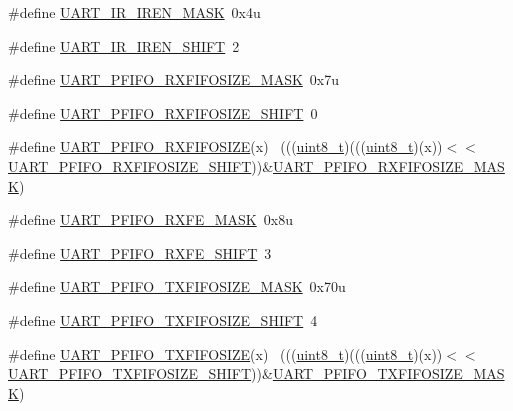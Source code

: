 \begin{DoxyCompactItemize}
\item 
\#define \hyperlink{group___u_a_r_t___register___masks_gafb25f2545b505763066c9f30ff7447f0}{U\+A\+R\+T\+\_\+\+I\+R\+\_\+\+I\+R\+E\+N\+\_\+\+M\+A\+SK}~0x4u
\item 
\#define \hyperlink{group___u_a_r_t___register___masks_ga674f392636537dcd6dd92309bead60b9}{U\+A\+R\+T\+\_\+\+I\+R\+\_\+\+I\+R\+E\+N\+\_\+\+S\+H\+I\+FT}~2
\item 
\#define \hyperlink{group___u_a_r_t___register___masks_gaf6314eec454a532d9baf2eff4ea61204}{U\+A\+R\+T\+\_\+\+P\+F\+I\+F\+O\+\_\+\+R\+X\+F\+I\+F\+O\+S\+I\+Z\+E\+\_\+\+M\+A\+SK}~0x7u
\item 
\#define \hyperlink{group___u_a_r_t___register___masks_gae4811b6796cb32adc0f9d172e9748e75}{U\+A\+R\+T\+\_\+\+P\+F\+I\+F\+O\+\_\+\+R\+X\+F\+I\+F\+O\+S\+I\+Z\+E\+\_\+\+S\+H\+I\+FT}~0
\item 
\#define \hyperlink{group___u_a_r_t___register___masks_gafd77c1537fe2b93d5ea7dd24c8cec96a}{U\+A\+R\+T\+\_\+\+P\+F\+I\+F\+O\+\_\+\+R\+X\+F\+I\+F\+O\+S\+I\+ZE}(x)                              ~(((\hyperlink{_p_e___types_8h_aba7bc1797add20fe3efdf37ced1182c5}{uint8\+\_\+t})(((\hyperlink{_p_e___types_8h_aba7bc1797add20fe3efdf37ced1182c5}{uint8\+\_\+t})(x))$<$$<$\hyperlink{group___u_a_r_t___register___masks_gae4811b6796cb32adc0f9d172e9748e75}{U\+A\+R\+T\+\_\+\+P\+F\+I\+F\+O\+\_\+\+R\+X\+F\+I\+F\+O\+S\+I\+Z\+E\+\_\+\+S\+H\+I\+FT}))\&\hyperlink{group___u_a_r_t___register___masks_gaf6314eec454a532d9baf2eff4ea61204}{U\+A\+R\+T\+\_\+\+P\+F\+I\+F\+O\+\_\+\+R\+X\+F\+I\+F\+O\+S\+I\+Z\+E\+\_\+\+M\+A\+SK})
\item 
\#define \hyperlink{group___u_a_r_t___register___masks_ga307298b76c15ac932486f994b3afc1b2}{U\+A\+R\+T\+\_\+\+P\+F\+I\+F\+O\+\_\+\+R\+X\+F\+E\+\_\+\+M\+A\+SK}~0x8u
\item 
\#define \hyperlink{group___u_a_r_t___register___masks_gae2a3c9994dc6da5a2955ac8c274bdaaf}{U\+A\+R\+T\+\_\+\+P\+F\+I\+F\+O\+\_\+\+R\+X\+F\+E\+\_\+\+S\+H\+I\+FT}~3
\item 
\#define \hyperlink{group___u_a_r_t___register___masks_ga61eb610888ac018061d20a755264292a}{U\+A\+R\+T\+\_\+\+P\+F\+I\+F\+O\+\_\+\+T\+X\+F\+I\+F\+O\+S\+I\+Z\+E\+\_\+\+M\+A\+SK}~0x70u
\item 
\#define \hyperlink{group___u_a_r_t___register___masks_gaa0377f9b585a07f11f887a7d2c8133c8}{U\+A\+R\+T\+\_\+\+P\+F\+I\+F\+O\+\_\+\+T\+X\+F\+I\+F\+O\+S\+I\+Z\+E\+\_\+\+S\+H\+I\+FT}~4
\item 
\#define \hyperlink{group___u_a_r_t___register___masks_ga944f9fd3754896fe2f66c42c25ffe13d}{U\+A\+R\+T\+\_\+\+P\+F\+I\+F\+O\+\_\+\+T\+X\+F\+I\+F\+O\+S\+I\+ZE}(x)                              ~(((\hyperlink{_p_e___types_8h_aba7bc1797add20fe3efdf37ced1182c5}{uint8\+\_\+t})(((\hyperlink{_p_e___types_8h_aba7bc1797add20fe3efdf37ced1182c5}{uint8\+\_\+t})(x))$<$$<$\hyperlink{group___u_a_r_t___register___masks_gaa0377f9b585a07f11f887a7d2c8133c8}{U\+A\+R\+T\+\_\+\+P\+F\+I\+F\+O\+\_\+\+T\+X\+F\+I\+F\+O\+S\+I\+Z\+E\+\_\+\+S\+H\+I\+FT}))\&\hyperlink{group___u_a_r_t___register___masks_ga61eb610888ac018061d20a755264292a}{U\+A\+R\+T\+\_\+\+P\+F\+I\+F\+O\+\_\+\+T\+X\+F\+I\+F\+O\+S\+I\+Z\+E\+\_\+\+M\+A\+SK})

\end{DoxyCompactItemize}
